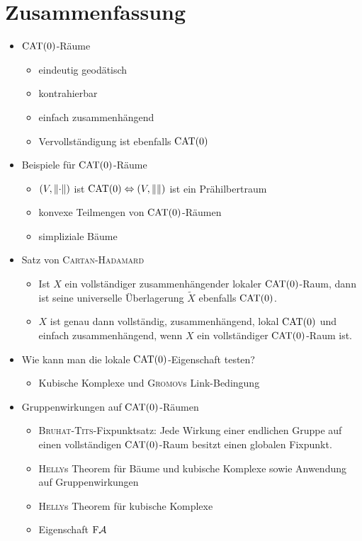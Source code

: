 \section*{Zusammenfassung}
\begin{itemize}
	\item $\operatorname{CAT(0)}$-Räume
		\begin{itemize}
			\item eindeutig geodätisch
			\item kontrahierbar
			\item einfach zusammenhängend
			\item Vervollständigung ist ebenfalls $\operatorname{CAT(0)}$
		\end{itemize}
	\item Beispiele für $\operatorname{CAT(0)}$-Räume
		\begin{itemize}
			\item $(V,\lVert\cdot\rVert)$ ist $\operatorname{CAT(0)} \Leftrightarrow (V,\lVert\rVert)$ ist ein Prähilbertraum
			\item konvexe Teilmengen von $\operatorname{CAT(0)}$-Räumen
			\item simpliziale Bäume
		\end{itemize}
	\item Satz von \textsc{Cartan-Hadamard}
		\begin{itemize}
			\item Ist $X$ ein vollständiger zusammenhängender lokaler $\operatorname{CAT(0)}$-Raum, dann ist seine universelle Überlagerung $\tilde{X}$ ebenfalls $\operatorname{CAT(0)}$.
			\item $X$ ist genau dann vollständig, zusammenhängend, lokal $\operatorname{CAT(0)}$ und einfach zusammenhängend, wenn $X$ ein vollständiger $\operatorname{CAT(0)}$-Raum ist.
		\end{itemize}
	\item Wie kann man die lokale $\operatorname{CAT(0)}$-Eigenschaft testen?
		\begin{itemize}
			\item Kubische Komplexe und \textsc{Gromov}s Link-Bedingung
		\end{itemize}
	\item Gruppenwirkungen auf $\operatorname{CAT(0)}$-Räumen
		\begin{itemize}
			\item \textsc{Bruhat-Tits}-Fixpunktsatz:
			Jede Wirkung einer endlichen Gruppe auf einen vollständigen $\operatorname{CAT(0)}$-Raum besitzt einen globalen Fixpunkt.
			\item \textsc{Helly}s Theorem für Bäume und kubische Komplexe sowie Anwendung auf Gruppenwirkungen
			\item \textsc{Helly}s Theorem für kubische Komplexe
			\item Eigenschaft $\text{F}\mathcal{A}$
		\end{itemize}
\end{itemize}
